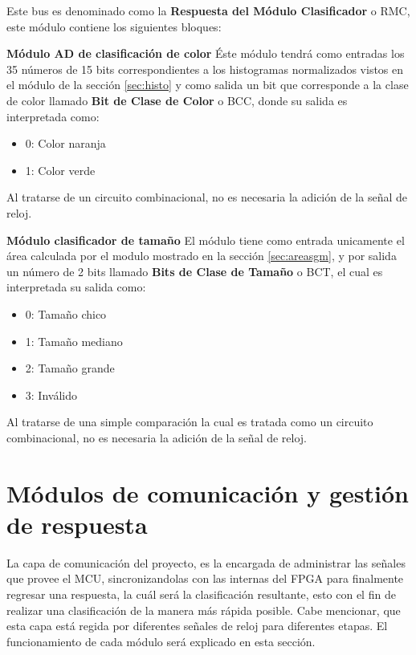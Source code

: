 \documentclass[twoside,spanish,ESP,MSc]{plantillaLabUPV}
\theoremstyle{definition}
\begin{document}
Este bus es denominado como la \textbf{Respuesta del Módulo Clasificador} o RMC, este módulo contiene los siguientes bloques:%


\checkmark\textbf{Módulo AD de clasificación de color} \label{sec:bcc}
Éste módulo tendrá como entradas los 35 números de 15 bits correspondientes a los histogramas normalizados vistos en el módulo de la sección \ref{sec:histo} y como salida un bit que corresponde a la clase de color llamado \textbf{Bit de Clase de Color} o BCC, donde su salida es interpretada como:

\begin{itemize}[noitemsep]
	\item 0: Color naranja
	\item 1: Color verde
\end{itemize}

Al tratarse de un circuito combinacional, no es necesaria la adición de la señal de reloj.


\checkmark\textbf{Módulo clasificador de tamaño} \label{sec:bct}
El módulo tiene como entrada unicamente el área calculada por el modulo mostrado en la sección \ref{sec:areasgm}, y  por salida un número de 2 bits llamado \textbf{Bits de Clase de Tamaño} o BCT, el cual es interpretada su salida como:

\begin{itemize}[noitemsep]
	\item 0: Tamaño chico
	\item 1: Tamaño mediano
	\item 2: Tamaño grande
	\item 3: Inválido
\end{itemize}

Al tratarse de una simple comparación la cual es tratada como un circuito combinacional, no es necesaria la adición de la señal de reloj.


\section{Módulos de comunicación y gestión de respuesta} \label{sec:comm}
La capa de comunicación del proyecto, es la encargada de administrar las señales que provee el MCU, sincronizandolas con las internas del FPGA para finalmente regresar una respuesta, la cuál será la clasificación resultante, esto con el fin de realizar una clasificación de la manera más rápida posible. Cabe mencionar, que esta capa está regida por diferentes señales de reloj para diferentes etapas. El funcionamiento de cada módulo será explicado en esta sección.\\
\end{document}

